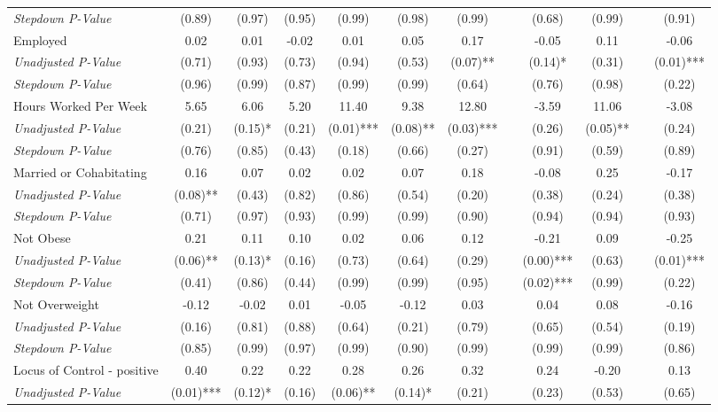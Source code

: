 \begin{tabular}{l c c c c c c c c c c c}
\quad \textit{Stepdown P-Value} & (0.89) & (0.97) & (0.95) & (0.99) & (0.98) & (0.99) & & (0.68) & (0.99) & & (0.91) \\
Employed & 0.02 & 0.01 & -0.02 & 0.01 & 0.05 & 0.17 & & -0.05 & 0.11 & & -0.06 \\
\quad \textit{Unadjusted P-Value} & (0.71) & (0.93) & (0.73) & (0.94) & (0.53) & (0.07)** & & (0.14)* & (0.31) & & (0.01)*** \\
\quad \textit{Stepdown P-Value} & (0.96) & (0.99) & (0.87) & (0.99) & (0.99) & (0.64) & & (0.76) & (0.98) & & (0.22) \\
Hours Worked Per Week & 5.65 & 6.06 & 5.20 & 11.40 & 9.38 & 12.80 & & -3.59 & 11.06 & & -3.08 \\
\quad \textit{Unadjusted P-Value} & (0.21) & (0.15)* & (0.21) & (0.01)*** & (0.08)** & (0.03)*** & & (0.26) & (0.05)** & & (0.24) \\
\quad \textit{Stepdown P-Value} & (0.76) & (0.85) & (0.43) & (0.18) & (0.66) & (0.27) & & (0.91) & (0.59) & & (0.89) \\
Married or Cohabitating & 0.16 & 0.07 & 0.02 & 0.02 & 0.07 & 0.18 & & -0.08 & 0.25 & & -0.17 \\
\quad \textit{Unadjusted P-Value} & (0.08)** & (0.43) & (0.82) & (0.86) & (0.54) & (0.20) & & (0.38) & (0.24) & & (0.38) \\
\quad \textit{Stepdown P-Value} & (0.71) & (0.97) & (0.93) & (0.99) & (0.99) & (0.90) & & (0.94) & (0.94) & & (0.93) \\
Not Obese & 0.21 & 0.11 & 0.10 & 0.02 & 0.06 & 0.12 & & -0.21 & 0.09 & & -0.25 \\
\quad \textit{Unadjusted P-Value} & (0.06)** & (0.13)* & (0.16) & (0.73) & (0.64) & (0.29) & & (0.00)*** & (0.63) & & (0.01)*** \\
\quad \textit{Stepdown P-Value} & (0.41) & (0.86) & (0.44) & (0.99) & (0.99) & (0.95) & & (0.02)*** & (0.99) & & (0.22) \\
Not Overweight & -0.12 & -0.02 & 0.01 & -0.05 & -0.12 & 0.03 & & 0.04 & 0.08 & & -0.16 \\
\quad \textit{Unadjusted P-Value} & (0.16) & (0.81) & (0.88) & (0.64) & (0.21) & (0.79) & & (0.65) & (0.54) & & (0.19) \\
\quad \textit{Stepdown P-Value} & (0.85) & (0.99) & (0.97) & (0.99) & (0.90) & (0.99) & & (0.99) & (0.99) & & (0.86) \\
Locus of Control - positive & 0.40 & 0.22 & 0.22 & 0.28 & 0.26 & 0.32 & & 0.24 & -0.20 & & 0.13 \\
\quad \textit{Unadjusted P-Value} & (0.01)*** & (0.12)* & (0.16) & (0.06)** & (0.14)* & (0.21) & & (0.23) & (0.53) & & (0.65) \\

\end{tabular}
